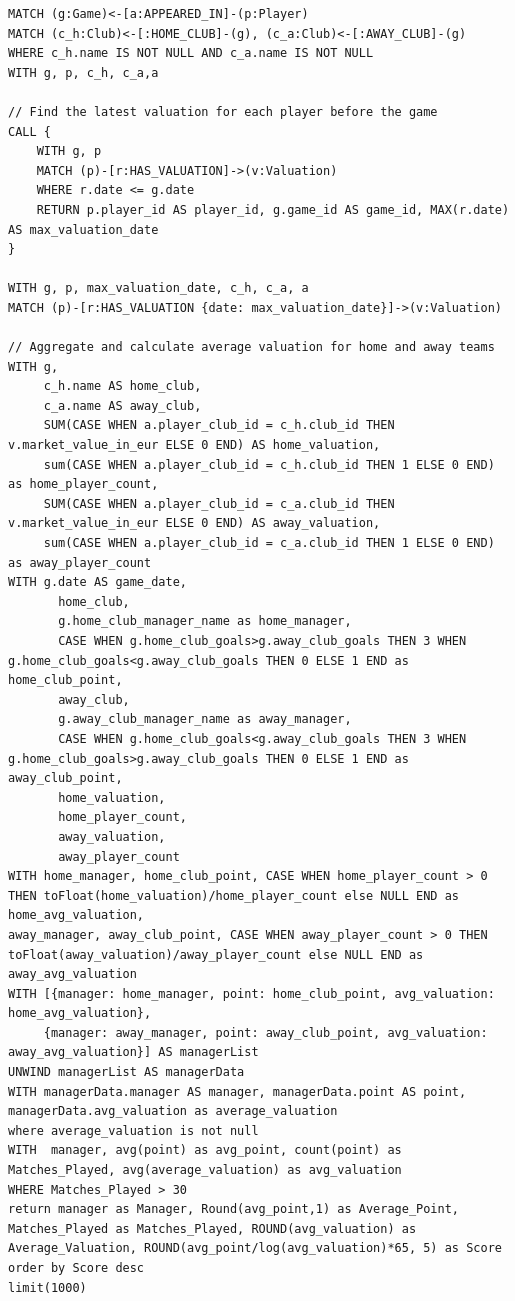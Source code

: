 \documentclass{Configuration_Files/PoliMi3i_thesis}
\begin{document}
\begin{lstlisting}[language=Cypher]
MATCH (g:Game)<-[a:APPEARED_IN]-(p:Player)
MATCH (c_h:Club)<-[:HOME_CLUB]-(g), (c_a:Club)<-[:AWAY_CLUB]-(g)
WHERE c_h.name IS NOT NULL AND c_a.name IS NOT NULL
WITH g, p, c_h, c_a,a

// Find the latest valuation for each player before the game
CALL {
    WITH g, p
    MATCH (p)-[r:HAS_VALUATION]->(v:Valuation)
    WHERE r.date <= g.date
    RETURN p.player_id AS player_id, g.game_id AS game_id, MAX(r.date) AS max_valuation_date
}

WITH g, p, max_valuation_date, c_h, c_a, a
MATCH (p)-[r:HAS_VALUATION {date: max_valuation_date}]->(v:Valuation)

// Aggregate and calculate average valuation for home and away teams
WITH g, 
     c_h.name AS home_club, 
     c_a.name AS away_club, 
     SUM(CASE WHEN a.player_club_id = c_h.club_id THEN v.market_value_in_eur ELSE 0 END) AS home_valuation,
     sum(CASE WHEN a.player_club_id = c_h.club_id THEN 1 ELSE 0 END) as home_player_count,
     SUM(CASE WHEN a.player_club_id = c_a.club_id THEN v.market_value_in_eur ELSE 0 END) AS away_valuation,
     sum(CASE WHEN a.player_club_id = c_a.club_id THEN 1 ELSE 0 END) as away_player_count
WITH g.date AS game_date, 
       home_club, 
       g.home_club_manager_name as home_manager,
       CASE WHEN g.home_club_goals>g.away_club_goals THEN 3 WHEN g.home_club_goals<g.away_club_goals THEN 0 ELSE 1 END as home_club_point,
       away_club, 
       g.away_club_manager_name as away_manager,
       CASE WHEN g.home_club_goals<g.away_club_goals THEN 3 WHEN g.home_club_goals>g.away_club_goals THEN 0 ELSE 1 END as away_club_point,
       home_valuation, 
       home_player_count,
       away_valuation,
       away_player_count
WITH home_manager, home_club_point, CASE WHEN home_player_count > 0 THEN toFloat(home_valuation)/home_player_count else NULL END as home_avg_valuation,
away_manager, away_club_point, CASE WHEN away_player_count > 0 THEN 
toFloat(away_valuation)/away_player_count else NULL END as away_avg_valuation
WITH [{manager: home_manager, point: home_club_point, avg_valuation: home_avg_valuation}, 
     {manager: away_manager, point: away_club_point, avg_valuation: away_avg_valuation}] AS managerList
UNWIND managerList AS managerData
WITH managerData.manager AS manager, managerData.point AS point, managerData.avg_valuation as average_valuation 
where average_valuation is not null
WITH  manager, avg(point) as avg_point, count(point) as Matches_Played, avg(average_valuation) as avg_valuation
WHERE Matches_Played > 30
return manager as Manager, Round(avg_point,1) as Average_Point, Matches_Played as Matches_Played, ROUND(avg_valuation) as Average_Valuation, ROUND(avg_point/log(avg_valuation)*65, 5) as Score
order by Score desc
limit(1000)
\end{lstlisting}
\end{document}
